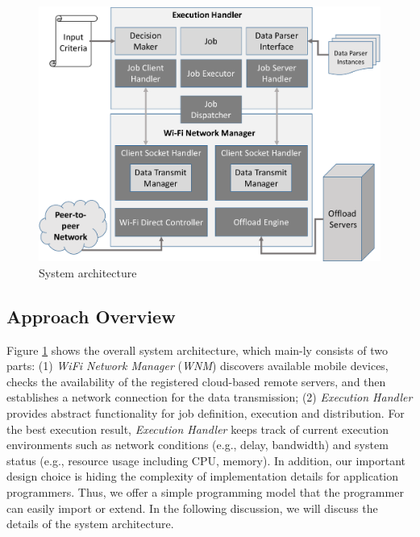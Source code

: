 \documentclass{sig-alternate}[10pt]
\begin{document}
\begin{CCSXML}
\begin{figure}
	\centering	
		\includegraphics[width=.95\linewidth]{data/jobShareArch.pdf}	
	\caption{System architecture}
	\label{fig:architecture}
\end{figure}


\subsection{Approach Overview}
Figure \ref{fig:architecture} shows the overall system architecture, which main-ly consists of two parts: (1) \emph{WiFi Network Manager} (\emph{WNM}) discovers available mobile devices, checks the availability of the registered cloud-based remote servers, and then establishes a network connection for the data transmission; (2) \emph{Execution Handler} provides abstract functionality for job definition, execution and distribution. For the best execution result, \emph{Execution Handler} keeps track of current execution environments such as network conditions (e.g., delay, bandwidth) and system status (e.g., resource usage including CPU, memory). In addition, our important design choice is hiding the complexity of implementation details for application programmers. Thus, we offer a simple programming model that the programmer can easily import or extend. In the following discussion, we will discuss the details of the system architecture.


\end{CCSXML}
\end{document}
